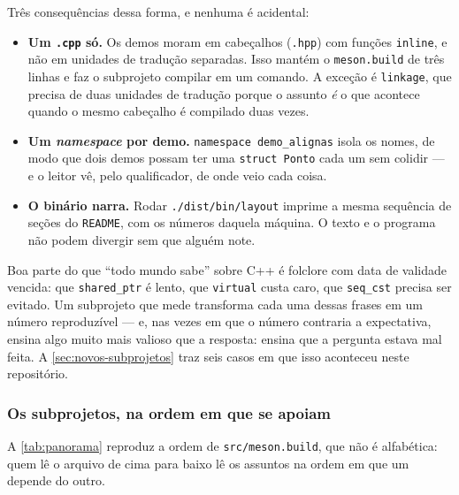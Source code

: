 Três consequências dessa forma, e nenhuma é acidental:

\begin{itemize}
    \item \textbf{Um \texttt{.cpp} só.} Os demos moram em cabeçalhos
          (\texttt{.hpp}) com funções \texttt{inline}, e não em unidades de
          tradução separadas. Isso mantém o \texttt{meson.build} de três linhas
          e faz o subprojeto compilar em um comando. A exceção é
          \texttt{linkage}, que precisa de duas unidades de tradução porque o
          assunto \emph{é} o que acontece quando o mesmo cabeçalho é compilado
          duas vezes.
    \item \textbf{Um \emph{namespace} por demo.} \texttt{namespace
          demo\_alignas} isola os nomes, de modo que dois demos possam ter uma
          \texttt{struct Ponto} cada um sem colidir --- e o leitor vê, pelo
          qualificador, de onde veio cada coisa.
    \item \textbf{O binário narra.} Rodar \texttt{./dist/bin/layout} imprime a
          mesma sequência de seções do \texttt{README}, com os números daquela
          máquina. O texto e o programa não podem divergir sem que alguém note.
\end{itemize}

\begin{porque}
Boa parte do que ``todo mundo sabe'' sobre C++ é folclore com data de validade
vencida: que \texttt{shared\_ptr} é lento, que \texttt{virtual} custa caro, que
\texttt{seq\_cst} precisa ser evitado. Um subprojeto que mede transforma cada
uma dessas frases em um número reproduzível --- e, nas vezes em que o número
contraria a expectativa, ensina algo muito mais valioso que a resposta: ensina
que a pergunta estava mal feita. A \cref{sec:novos-subprojetos} traz seis casos
em que isso aconteceu neste repositório.
\end{porque}

\subsubsection{Os subprojetos, na ordem em que se apoiam}

A \cref{tab:panorama} reproduz a ordem de \texttt{src/meson.build}, que não é
alfabética: quem lê o arquivo de cima para baixo lê os assuntos na ordem em que
um depende do outro.

